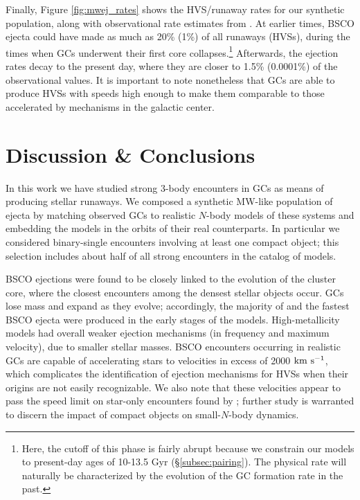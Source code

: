 \documentclass[twocolumn,linenumbers]{aastex631}
\newcommand{\kms}{${\rm km~s^{-1}}$}
\begin{document}
Finally, Figure \ref{fig:mwej_rates} shows the HVS/runaway rates for our synthetic population, along with observational rate estimates from \citet{2015ARA&A..53...15B}.
At earlier times, BSCO ejecta could have made as much as 20\% (1\%) of all runaways (HVSs), during the times when GCs underwent their first core collapses.\footnote{Here, the cutoff of this phase is fairly abrupt because we constrain our models to present-day ages of 10-13.5 Gyr (\S\ref{subsec:pairing}).  The physical rate will naturally be characterized by the evolution of the GC formation rate in the past.}
Afterwards, the ejection rates decay to the present day, where they are closer to 1.5\% (0.0001\%) of the observational values.
It is important to note nonetheless that GCs are able to produce HVSs with speeds high enough to make them comparable to those accelerated by mechanisms in the galactic center.

\section{Discussion \& Conclusions} \label{sec:disccon}

In this work we have studied strong 3-body encounters in GCs as means of producing stellar runaways.
We composed a synthetic MW-like population of ejecta by matching observed GCs to realistic $N$-body models of these systems and embedding the models in the orbits of their real counterparts.
In particular we considered binary-single encounters involving at least one compact object; this selection includes about half of all strong encounters in the catalog of models.

BSCO ejections were found to be closely linked to the evolution of the cluster core, where the closest encounters among the densest stellar objects occur.
GCs lose mass and expand as they evolve; accordingly, the majority of and the fastest BSCO ejecta were produced in the early stages of the models.
High-metallicity models had overall weaker ejection mechanisms (in frequency and maximum velocity), due to smaller stellar masses.
BSCO encounters occurring in realistic GCs are capable of accelerating stars to velocities in excess of 2000 \kms, which complicates the identification of ejection mechanisms for HVSs when their origins are not easily recognizable.
We also note that these velocities appear to pass the speed limit on star-only encounters found by \citet{1991AJ....101..562L}; further study is warranted to discern the impact of compact objects on small-$N$-body dynamics.
\end{document}
